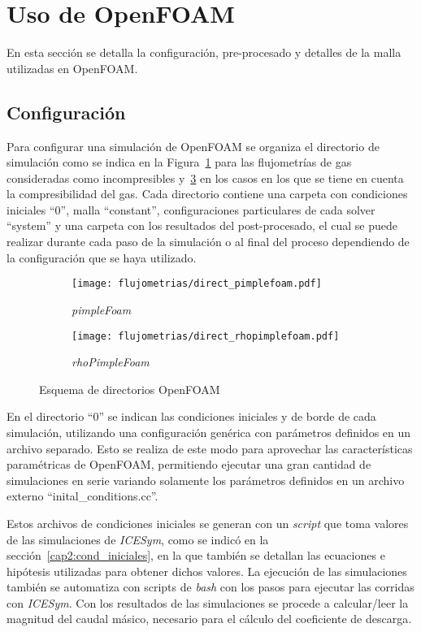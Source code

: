 \section{Uso de OpenFOAM}

En esta sección se detalla la configuración, pre-procesado y detalles de la
malla utilizadas en OpenFOAM.

\subsection{Configuración}
%
Para configurar una simulación de OpenFOAM se organiza el directorio de
simulación como se indica en la Figura~\ref{fig:direc_pf} para las flujometrías
de gas consideradas como incompresibles y~\ref{fig:direc_rpf} en los casos en los
que se tiene en cuenta la compresibilidad del gas.
%
Cada directorio contiene una carpeta con condiciones iniciales ``0'', malla
``constant'', configuraciones particulares de cada solver ``system'' y una
carpeta con los resultados del post-procesado, el cual se puede realizar durante
cada paso de la simulación o al final del proceso dependiendo de la
configuración que se haya utilizado.

\begin{figure}[h!]  \centering
  \begin{subfigure}[b]{0.4\textwidth} \centering
\texttt{[image: flujometrias/direct\_pimplefoam.pdf]}
    \caption{\emph{pimpleFoam}\label{fig:direc_pf} }
  \end{subfigure}%
  \begin{subfigure}[b]{0.4\textwidth} \centering
\texttt{[image: flujometrias/direct\_rhopimplefoam.pdf]}
    \caption{\emph{rhoPimpleFoam}\label{fig:direc_rpf} }
  \end{subfigure}
  \caption{Esquema de directorios OpenFOAM}
\end{figure}


En el directorio ``0'' se indican las condiciones iniciales y de borde de cada
simulación, utilizando una configuración genérica con parámetros definidos en un
archivo separado.
%
Esto se realiza de este modo para aprovechar las características paramétricas de
OpenFOAM, permitiendo ejecutar una gran cantidad de simulaciones en serie
variando solamente los parámetros definidos en un archivo externo
``inital\_conditions.cc''.

Estos archivos de condiciones iniciales se generan con un \emph{script} que toma
valores de las simulaciones de \emph{ICESym}, como se indicó en la
sección~\ref{cap2:cond_iniciales}, en la que también se detallan las ecuaciones
e hipótesis utilizadas para obtener dichos valores.
%
La ejecución de las simulaciones también se automatiza con scripts de
\emph{bash} con los pasos para ejecutar las corridas con \emph{ICESym}.
%
Con los resultados de las simulaciones se procede a calcular/leer la magnitud
del caudal másico, necesario para el cálculo del coeficiente de descarga.


